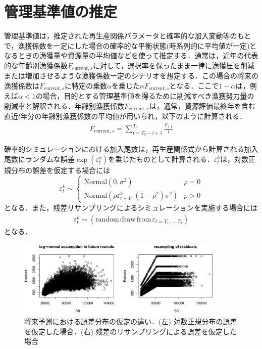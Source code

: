 \documentclass[11pt]{jsarticle}
\begin{document}
\section{管理基準値の推定}
管理基準値は，推定された再生産関係パラメータと確率的な加入変動等のもとで，漁獲係数を一定にした場合の確率的な平衡状態(時系列的に平均値が一定)となるときの漁獲量や資源量の平均値などを使って推定する．通常は，近年の代表的な年齢別漁獲係数$F_{\mathrm{current},s}$に対して，選択率を保ったまま一律に漁獲圧を削減または増加させるような漁獲係数一定のシナリオを想定する．この場合の将来の漁獲係数は$F_{\mathrm{current},s}$に特定の乗数$\alpha$を乗じた$\alpha F_{\mathrm{current},s}$となる．ここで$1-\alpha$は，例えば$\alpha<1$の場合，目的とする管理基準値を得るために削減すべき漁獲努力量の削減率と解釈される．年齢別漁獲係数$F_{\mathrm{current},s}$は，通常，資源評価最終年を含む直近$l$年分の年齢別漁獲係数の平均値が用いられ，以下のように計算される．
\begin{eqnarray}
  F_{\mathrm{current},s} = \sum_{t=T_3-l+1}^{T_3}\frac{F_{s,t}}{l}
\end{eqnarray}

確率的シミュレーションにおける加入尾数は，再生産関係式から計算される加入尾数にランダムな誤差$\exp (\varepsilon_t^k)$を乗じたものとして計算される．$\varepsilon_t^k$は，対数正規分布の誤差を仮定する場合には
\begin{equation}
  \varepsilon_t^k \sim \begin{cases}
    \mathrm{Normal} (0,\sigma^2 ) & \rho=0 \\
    \mathrm{Normal} (\rho \varepsilon_{t-1}^k,(1-\rho^2) \sigma^2) & \rho>0
  \end{cases}
  \label{epsilon1}
\end{equation}
となる．また，残差リサンプリングによるシミュレーションを実施する場合には
\begin{eqnarray}
  \varepsilon_t^k \sim (\mathrm{random} \, \mathrm{draw} \, \mathrm{from} \, \varepsilon_{t={T_1,…,T_2}})
  \label{epsilon2}  
\end{eqnarray}
となる．

\begin{figure}[t]
  \includegraphics[width=10cm]{fig_resample.png}
  \caption{将来予測における誤差分布の仮定の違い．(左) 対数正規分布の誤差を仮定した場合．(右) 残差のリサンプリングによる誤差を仮定した場合}
  \label{fig_resample}
\end{figure}
\end{document}
